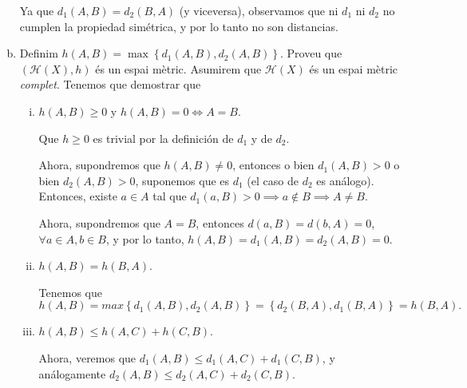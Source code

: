 \documentclass[12pt]{article}
\newcommand{\h}{\mathscr{H}}
\newcommand\setb[1]{\left\{#1\right\}}
\theoremstyle{break}
\begin{document}
\begin{enumerate}[a)]
\begin{center}
	\end{center}
	Ya que $d_1(A,B) = d_2(B, A)$ (y viceversa), observamos que ni
	$d_1$ ni $d_2$ no cumplen la propiedad simétrica, y por lo
	tanto no son distancias.
\item Definim $h(A,B) = \max \setb{d_1(A, B), d_2(A,
	B)}$. Proveu que $\left( \h(X), h\right)$ és un espai
	mètric.  Asumirem que $\h(X)$ és un espai mètric
	\emph{complet}.
	\newpage
	Tenemos que demostrar que
	\begin{enumerate}[i)]
	\item $h(A,B) \geq 0$ y $h(A, B) = 0 \iff A = B$.

		Que $h \geq 0$ es trivial por la definición de $d_1$ y de
		$d_2$.

		Ahora, supondremos que $h(A, B) \neq 0$, entonces o bien
		$d_1(A, B) > 0$ o bien $d_2(A, B) > 0$, suponemos que es
		$d_1$ (el caso de $d_2$ es análogo). Entonces, existe
		$a \in A$ tal que
		$d_1(a, B) > 0 \implies a \notin B \implies A \neq B$.

		Ahora, supondremos que $A = B$, entonces
		$d(a, B) = d(b, A) = 0$, $\forall a \in A, b \in B$, y por
		lo tanto, $h(A, B) = d_1(A, B) = d_2(A, B) = 0$.
	\item $h(A, B) = h(B, A)$.

		Tenemos que
		\[
			h(A, B) = max \setb{d_1(A, B), d_2(A, B)} = \setb{d_2(B,
			A), d_1(B, A)} = h(B, A).
		\]
	\item $h(A, B) \leq h(A, C) + h(C, B)$.

		Ahora, veremos que $d_1(A, B) \leq d_1(A, C) + d_1(C, B)$,
		y análogamente $d_2(A, B) \leq d_2(A, C) + d_2(C, B)$.
		

\end{enumerate}
\end{enumerate}
\end{document}
